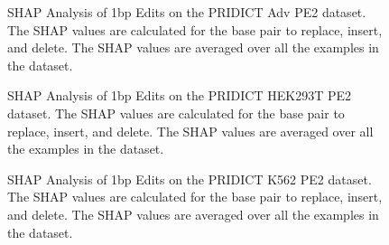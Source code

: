 \begin{figure}[ht]
    \centering
    \caption[SHAP Analysis of 1bp Edits on PRIDICT Adv PE2 Dataset]{SHAP Analysis of 1bp Edits on the PRIDICT Adv PE2 dataset. The SHAP values are calculated for the base pair to replace, insert, and delete. The SHAP values are averaged over all the examples in the dataset.}
    \label{fig:shap-1bp-adv-pe2}
\end{figure}

\begin{figure}[ht]
    \centering
    \caption[SHAP Analysis of 1bp Edits on PRIDICT HEK293T PE2 Dataset]{SHAP Analysis of 1bp Edits on the PRIDICT HEK293T PE2 dataset. The SHAP values are calculated for the base pair to replace, insert, and delete. The SHAP values are averaged over all the examples in the dataset.}
    \label{fig:shap-1bp-hek293t-pe2}
\end{figure}

\begin{figure}[ht]
    \centering
    \caption[SHAP Analysis of 1bp Edits on PRIDICT K562 PE2 Dataset]{SHAP Analysis of 1bp Edits on the PRIDICT K562 PE2 dataset. The SHAP values are calculated for the base pair to replace, insert, and delete. The SHAP values are averaged over all the examples in the dataset.}
    \label{fig:shap-1bp-k562-pe2}
\end{figure}

